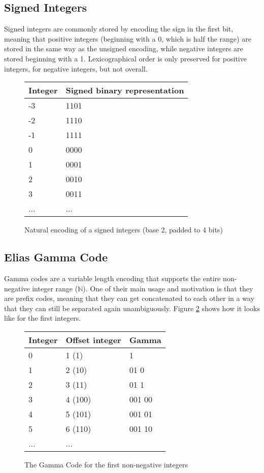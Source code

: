 \documentclass{acm_proc_article-sp}
\begin{document}
\subsection{Signed Integers}

Signed integers are commonly stored by encoding the sign in the first bit, meaning that positive integers (beginning with a 0, which is half the range) are stored in the same way as the unsigned encoding, while negative integers are stored beginning with a 1. Lexicographical order is only preserved for positive integers, for negative integers, but not overall.

\begin{figure}
\caption{Natural encoding of a signed integers (base 2, padded to 4 bits)}
\label{figure-natural-signed-encoding}
\center
\begin{tabular}{|l|l|}
\hline
Integer & Signed binary representation \\
\hline
-3 & 1101 \\
\hline
-2 & 1110 \\
\hline
-1 & 1111 \\
\hline
0 & 0000 \\
\hline
1 & 0001 \\
\hline
2 & 0010 \\
\hline
3 & 0011 \\
\hline
... & ... \\
\hline
\end{tabular}
\end{figure}

\subsection{Elias Gamma Code}
\label{section-gamma-code}

Gamma codes are a variable length encoding that supports the entire non-negative integer range ($\mathbb{N}$). One of their main usage and motivation is that they are prefix codes, meaning that they can get concatenated to each other in a way that they can still be separated again unambiguously. Figure \ref{figure-gamma-encoding} shows how it looks like for the first integers.

\begin{figure}
\caption{The Gamma Code for the first non-negative integers}
\label{figure-gamma-encoding}
\center
\begin{tabular}{|l|l|l|}
\hline
Integer & Offset integer & Gamma \\
\hline
0 & 1 (1) & 1 \\
\hline
1 & 2 (10) & 01 0  \\
\hline
2 & 3 (11) & 01 1  \\
\hline
3 & 4 (100) & 001 00 \\
\hline
4 & 5 (101) & 001 01 \\
\hline
5 & 6 (110) & 001 10 \\
\hline
... & ... \\
\hline
\end{tabular}
\end{figure}
\end{document}

